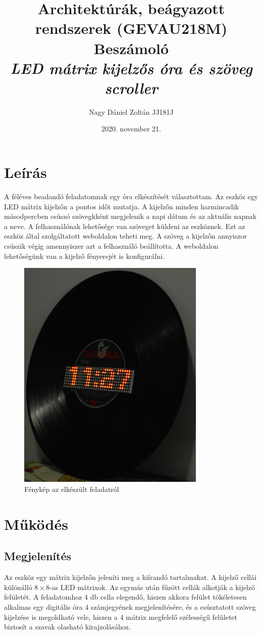 \documentclass[a4paper, 12pt]{article}
\title{Architektúrák, beágyazott rendszerek (GEVAU218M)\\\LARGE{\textbf{Beszámoló}}\\ \bigskip \Large{\textit{LED mátrix kijelzős óra és szöveg scroller}}}
\date{2020. november 21.}
\author{Nagy Dániel Zoltán JJ181J}
\begin{document}
\maketitle

\section{Leírás}
A féléves beadandó feladatomnak egy óra elkészítését választottam.
Az eszköz egy LED mátrix kijelzőn a pontos időt mutatja. A kijelzőn minden harmincadik másodpercben csúszó szövegkként megjelenik a napi dátum és az aktuális napnak a neve. A felhasználónak lehetősége van szöveget küldeni az eszköznek. Ezt az eszköz által szolgáltatott weboldalon teheti meg. A szöveg a kijelzőn annyiszor csúszik végig amennyiszer azt a felhasználó beállította. A weboldalon lehetőségünk van a kijelző fényerejét is konfigurálni.

\begin{figure}[ht]
	\centering
	\includegraphics[width = 9cm]{images/vinyl_clock.JPG}
	\caption{Fénykép az elkészült feladatról}
	\label{fig:product}
\end{figure}	

\section{Működés}

\subsection{Megjelenítés}
Az eszköz egy mátrix kijelzőn jeleníti meg a kiírandó tartalmakat. A kijelző cellái különálló $8\times 8$-as LED mátrixok. Az egymás után fűzött cellák alkotják a kijelző felületét. A feladatomhoz 4 db cella elegendő, hiszen akkora felület tökéletesen alkalmas egy digitális óra 4 számjegyének megjelenítésére, és a csúsztatott szöveg kijelzése is megoldható vele, hiszen a 4 mátrix megfelelő szélességű felületet biztosít a szavak olasható kirajzolásához.
\end{document}
